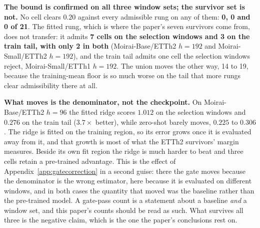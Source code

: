 \begin{table}[ht]
\centering
\caption{\textbf{The eight-rung ladder on three window sets.}  Cells each rung
admits: its denominator is at least as good as the training-mean floor on that cell
\emph{and} the cell's $\Vb{b}$ clears $0.20$.  Every column is out of the same 21
Moirai cells (the ones the train-tail arm covers), so the counts are comparable
across columns and are not the 31- and 32-cell counts quoted elsewhere.
\emph{Selection} is the paper's primary, \emph{held-out} the retrospective variant,
and \emph{train tail} the last $20\%$ of the training region, used for neither
checkpoint selection nor outcome scoring.  The bottom row is the paper's conservative
bound, and it is zero on all three.}
\label{tab:splitcompare}

\end{table}

\textbf{The bound is confirmed on all three window sets; the survivor set is not.}
No cell clears $0.20$ against every admissible rung on any of them: \textbf{0, 0 and
0 of 21}.  The fitted rung, which is where the paper's seven survivors come from,
does not transfer: it admits \textbf{7 cells on the selection windows and 3 on the
train tail, with only 2 in both} (Moirai-Base/ETTh2 $h{=}192$ and
Moirai-Small/ETTh2 $h{=}192$), and the train tail admits one cell the selection
windows reject, Moirai-Small/ETTh1 $h{=}192$.  The union moves the other way, 14 to
19, because the training-mean floor is so much worse on the tail that more rungs
clear admissibility there at all.

\textbf{What moves is the denominator, not the checkpoint.}  On
Moirai-Base/ETTh2 $h{=}96$ the fitted ridge scores $1.012$ on the selection windows
and $0.276$ on the train tail ($3.7\times$ better), while zero-shot barely moves,
$0.225$ to $0.306$.  The ridge is fitted on the training region, so its error grows
once it is evaluated away from it, and that growth is most of what the ETTh2
survivors' margin measures.  Beside its own fit region the ridge is much harder to
beat and three cells retain a pre-trained advantage.  This is the effect of
Appendix~\ref{app:gatecorrection} in a second guise: there the gate moves because the
denominator is the wrong estimator, here because it is evaluated on different
windows, and in both cases the quantity that moved was the baseline rather than the
pre-trained model.  A gate-pass count is a statement about a baseline \emph{and} a
window set, and this paper's counts should be read as such.  What survives all three
is the negative claim, which is the one the paper's conclusions rest on.

